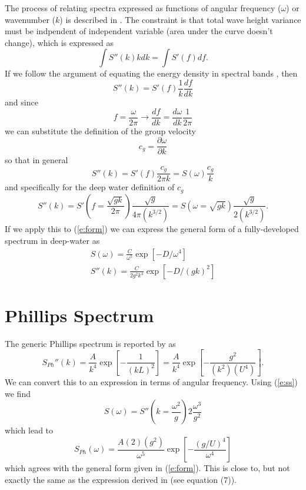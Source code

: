 \documentclass[11pt]{article}
\begin{document}
The process of relating spectra expressed as functions of angular frequency ($\omega$) or wavenumber ($k$) is described in \cite{plant09ocean}.  The constraint is that total wave height variance must be indpendent of independent variable (area under the curve doesn't change), which is expressed as
\begin{equation}
\int S''(k) k dk = \int S'(f) df.
\end{equation}
If we follow the argument of equating the energy density in spectral bands \cite{}, then
\begin{equation} S''(k) = S'(f) \frac{1}{k} \frac{df}{dk}\end{equation}
and since
\begin{equation} f = \frac{\omega}{2 \pi} \rightarrow \frac{df}{dk}=\frac{d\omega}{dk}\frac{1}{2 \pi} \end{equation}
we can substitute the definition of the group velocity
\begin{equation} c_g = \frac{\partial \omega}{\partial k} \end{equation}
so that in general
\begin{equation} S''(k) = S'(f) \frac{c_g}{2 \pi k} = S(\omega) \frac{c_g}{k}\end{equation}
and specifically for the deep water definition of $c_g$
\begin{equation} S''(k) = 
S'\left(f=\frac{\sqrt{gk}}{2\pi}\right) \frac{\sqrt{g}}{4 \pi \left(k^{3/2}\right)} = 
S\left(\omega=\sqrt{gk}\right)\frac{\sqrt{g}}{2 \left(k^{3/2}\right)}.
\label{e:ss}
\end{equation}
If we apply this to (\ref{e:form}) we can express the general form of a fully-developed spectrum in deep-water as
\begin{eqnarray}
S(\omega) = \frac{C}{\omega^5} \exp{\left[ -D/\omega^4 \right]} \\
S''(k) = \frac{C}{2 g^2 k^4} \exp{\left[-D/(gk)^2\right]}
\end{eqnarray}

\section{Phillips Spectrum}
The generic Phillips spectrum is reported by \cite{tessendorf99simulating} as 
\begin{equation} S_{Ph}''(k)= \frac{A}{k^4} \exp{\left[ - \frac{1}{(kL)^2} \right]} 
= \frac{A}{k^4} \exp{\left[ - \frac{g^2}{(k^2)(U^4)} \right]} .
\label{e:phk}
\end{equation}
We can convert this to an expression in terms of angular frequency. Using (\ref{e:ss}) we find
\begin{equation}
S(\omega) = S''\left(k=\frac{\omega^2}{g}\right) 2 \frac{\omega^3}{g^2}
\label{e:phw}
\end{equation}
which lead to
\begin{equation}
S_{Ph}(\omega) = \frac{A(2)(g^2)}{\omega^5} \exp{\left[ - \frac{ (g/U)^4 }{\omega^4} \right]}
\end{equation}
which agrees with the general form given in (\ref{e:form}). This is close to, but not exactly the same as the expression derived in \cite{chen2013onthe} (see equation (7)).
\end{document}
